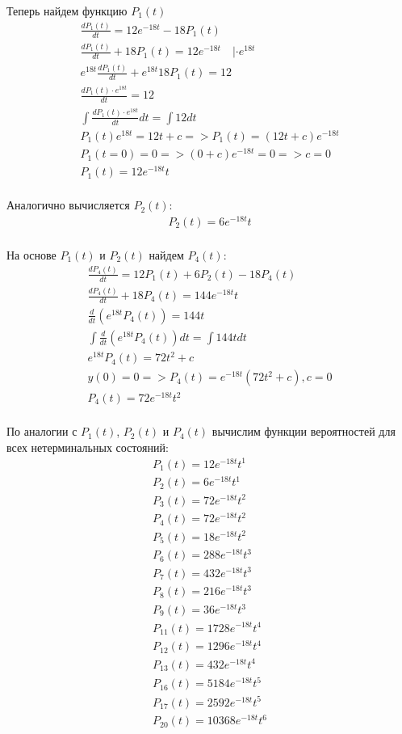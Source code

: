 Теперь найдем функцию $P_1 (t)$
\begin{gather*}
    \frac{d P_1(t)}{dt} = 12 e^{-18 t} - 18 P_1(t)\\
    \frac{d P_1(t)}{dt} + 18 P_1(t) = 12 e^{ -18 t} \quad |\cdot e^{ 18 t} \\
    e^{ 18 t} \frac{d P_1(t)}{dt} + e^{ 18 t} 18 P_1(t) = 12\\
    \frac{d P_1(t) \cdot e^{ 18 t }}{dt} = 12\\
    \int \frac{d P_1(t) \cdot e^{ 18 t } }{dt} dt = \int 12 dt\\
    P_1(t) e^{ 18 t } = 12 t + c => P_1(t) = ( 12 t + c) e^{ -18 t } \\
    P_1(t=0) = 0 => ( 0 + c ) e^{ -18 t } = 0 => c=0\\
    P_1(t) = 12 e^{ -18 t } t\\
\end{gather*}

Аналогично вычисляется $P_2 (t)$:
\begin{gather*}
    P_2(t) = 6 e^{- 18 t}t\\
\end{gather*}

На основе $P_1 (t)$ и $P_2 (t)$ найдем $P_4 (t)$:
\begin{gather*}
    \frac{d P_4(t)}{dt} = 12 P_1 (t) + 6 P_2 (t) - 18 P_4(t)\\
    \frac{d P_4(t)}{dt} + 18 P_4(t) = 144 e^{- 18 t} t\\
    \frac{d}{dt} (e^{ 18 t} P_4(t)) = 144 t\\
    \int \frac{d}{dt} (e^{ 18 t} P_4(t)) dt = \int 144 t dt\\
    e^{ 18 t} P_4(t) = 72 t^2 + c \\
    y(0) = 0 => P_4(t) = e^{ -18 t} ( 72 t^2 + c), c = 0 \\
    P_4(t) = 72 e^{ -18 t} t^2\\
\end{gather*}

\newpage
По аналогии с $P_1 (t)$, $P_2 (t)$ и $P_4 (t)$ вычислим функции вероятностей для всех нетерминальных состояний:
\begin{gather*}
    P_{1} (t)=12e^{-18t} t^1 \\ 
P_{2} (t)=6e^{-18t} t^1 \\ 
P_{3} (t)=72e^{-18t} t^2 \\ 
P_{4} (t)=72e^{-18t} t^2 \\ 
P_{5} (t)=18e^{-18t} t^2 \\ 
P_{6} (t)=288e^{-18t} t^3 \\ 
P_{7} (t)=432e^{-18t} t^3 \\ 
P_{8} (t)=216e^{-18t} t^3 \\ 
P_{9} (t)=36e^{-18t} t^3 \\ 
P_{11} (t)=1728e^{-18t} t^4 \\ 
P_{12} (t)=1296e^{-18t} t^4 \\ 
P_{13} (t)=432e^{-18t} t^4 \\ 
P_{16} (t)=5184e^{-18t} t^5 \\ 
P_{17} (t)=2592e^{-18t} t^5 \\ 
P_{20} (t)=10368e^{-18t} t^6 \\ 
\end{gather*}

